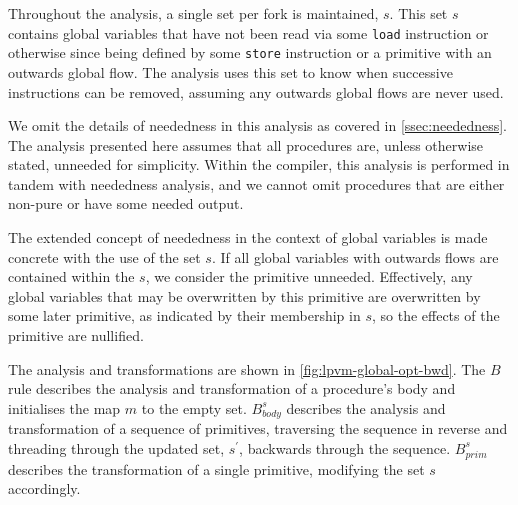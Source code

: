 Throughout the analysis, a single set per fork is maintained, $s$. This set $s$ contains global variables that have not been read via some \texttt{load} instruction or otherwise since being defined by some \texttt{store} instruction or a primitive with an outwards global flow. The analysis uses this set to know when successive instructions can be removed, assuming any outwards global flows are never used. 

We omit the details of neededness in this analysis as covered in \cref{ssec:neededness}. The analysis presented here assumes that all procedures are, unless otherwise stated, unneeded for simplicity. Within the compiler, this analysis is performed in tandem with neededness analysis, and we cannot omit procedures that are either non-pure or have some needed output. 

The extended concept of neededness in the context of global variables is made concrete with the use of the set $s$. If all global variables with outwards flows are contained within the $s$, we consider the primitive unneeded. Effectively, any global variables that may be overwritten by this primitive are overwritten by some later primitive, as indicated by their membership in $s$, so the effects of the primitive are nullified.

The analysis and transformations are shown in \cref{fig:lpvm-global-opt-bwd}. The $B$ rule describes the analysis and transformation of a procedure's body and initialises the map $m$ to the empty set. $B_{body}^s$ describes the analysis and transformation of a sequence of primitives, traversing the sequence in reverse and threading through the updated set, $s^\prime$, backwards through the sequence. $B_{prim}^s$ describes the transformation of a single primitive, modifying the set $s$ accordingly.

